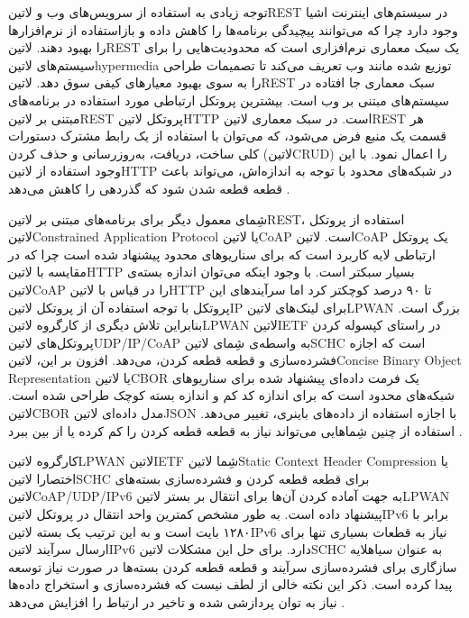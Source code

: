 توجه زیادی به استفاده از سرویس‌های وب و ‌لاتین{REST} در سیستم‌های اینترنت اشیا وجود دارد چرا که
می‌توانند پیچیدگی برنامه‌ها را کاهش داده و بازاستفاده از نرم‌افزارها را بهبود دهند.
‌لاتین{REST} یک سبک معماری نرم‌افزاری است که محدودیت‌هایی را برای سیستم‌های ‌لاتین{hypermedia} توزیع شده مانند وب
تعریف می‌کند تا تصمیمات طراحی را به سوی بهبود معیارهای کیفی سوق دهد.
‌لاتین{REST} سبک معماری جا افتاده در سیستم‌های مبتنی بر وب است.
بیشترین پروتکل ارتباطی مورد استفاده در برنامه‌های مبتنی بر ‌لاتین{REST} پروتکل ‌لاتین{HTTP} است.
در سبک معماری ‌لاتین{REST} هر قسمت یک منبع فرض می‌شود، که می‌توان با استفاده از یک رابط مشترک
دستورات کلی ساخت، دریافت، به‌روزرسانی و حذف کردن (‌لاتین{CRUD}) را اعمال نمود.
با این وجود استفاده از ‌لاتین{HTTP} در شبکه‌های محدود با توجه به اندازه‌اش، می‌تواند
باعث قطعه قطعه شدن شود که گذردهی را کاهش می‌دهد
.

شِمای معمول دیگر برای برنامه‌های مبتنی بر ‌لاتین{REST}، استفاده از پروتکل ‌لاتین{Constrained Application Protocol} یا ‌لاتین{CoAP}
است. ‌لاتین{CoAP} یک پروتکل ارتباطی لایه کاربرد است که برای سناریوهای محدود پیشنهاد شده است چرا که در مقایسه با ‌لاتین{HTTP}
بسیار سبکتر است.
با وجود اینکه می‌توان اندازه بسته‌ی ‌لاتین{CoAP} را در قیاس با ‌لاتین{HTTP} تا ۹۰ درصد کوچکتر کرد اما سرآیندهای این پروتکل با توجه
استفاده آن از پروتکل ‌لاتین{IP} برای لینک‌های ‌لاتین{LPWAN} بزرگ است.
بنابراین تلاش دیگری از کارگروه ‌لاتین{LPWAN} ‌لاتین{IETF} در راستای کپسوله کردن پروتکل‌های ‌لاتین{UDP/IP/CoAP}
به واسطه‌ی شِمای ‌لاتین{SCHC} است که اجازه فشرده‌سازی و قطعه قطعه کردن، می‌دهد.
افزون بر این، ‌لاتین{Concise Binary Object Representation} یا ‌لاتین{CBOR} یک فرمت داده‌ای پیشنهاد شده برای سناریوهای
شبکه‌های محدود است که برای اندازه کد کم و اندازه بسته کوچک طراحی شده است.
‌لاتین{CBOR} مدل داده‌ای ‌لاتین{JSON} با اجازه استفاده از داده‌های باینری، تغییر می‌دهد.
استفاده از چنین شِماهایی می‌تواند نیاز به قطعه قطعه کردن را کم کرده یا از بین ببرد
.

کارگروه ‌لاتین{LPWAN} ‌لاتین{IETF} شِما ‌لاتین{Static Context Header Compression} یا اختصارا ‌لاتین{SCHC}
برای قطعه قطعه کردن و فشرده‌سازی بسته‌های ‌لاتین{CoAP/UDP/IPv6} به جهت آماده کردن آن‌ها برای انتقال بر بستر ‌لاتین{LPWAN}
پیشنهاد داده است. به طور مشخص کمترین واحد انتقال در پروتکل ‌لاتین{IPv6} برابر با ۱۲۸۰ بایت است و به این ترتیب یک بسته ‌لاتین{IPv6}
نیاز به قطعات بسیاری تنها برای ارسال سرآیند ‌لاتین{IPv6} دارد. برای حل این مشکلات ‌لاتین{SCHC} به عنوان ‌سیاه{لایه سازگاری}
برای فشرده‌سازی سرآیند و قطعه قطعه کردن بسته‌ها در صورت نیاز توسعه پیدا کرده است.
ذکر این نکته خالی از لطف نیست که فشرده‌سازی و استخراج داده‌ها نیاز به توان پردازشی شده و تاخیر در ارتباط را افزایش می‌دهد
.

